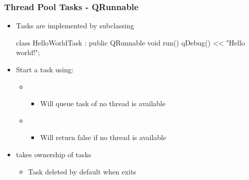 

\begin{slide}[fragile]
\frametitle{Thread Pool Tasks - QRunnable}

\begin{itemize}
\item Tasks are implemented by subclassing 
\begin{cpp}
class HelloWorldTask : public QRunnable
{
    void run() { qDebug() << "Hello world!"; }
}
\end{cpp}
\item Start a  task using:
  \begin{itemize}
  \item {}
    \begin{itemize}
    \item Will queue task of no thread is available
    \end{itemize}
  \item {}
    \begin{itemize}
    \item Will return false if no thread is available
    \end{itemize}
  \end{itemize}
\item {} takes ownership of  tasks
  \begin{itemize}
  \item Task deleted by default when  exits
  \end{itemize}
\end{itemize}

\end{slide}



